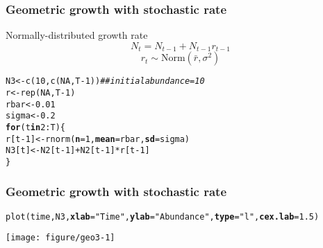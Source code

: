 \documentclass[color=usenames,dvipsnames]{beamer}\usepackage[]{graphicx}\usepackage[]{color}
\makeatletter
\newcommand{\hlnum}[1]{\textcolor[rgb]{0.69,0.494,0}{#1}}%
\newcommand{\hlstr}[1]{\textcolor[rgb]{0.749,0.012,0.012}{#1}}%
\newcommand{\hlcom}[1]{\textcolor[rgb]{0.514,0.506,0.514}{\textit{#1}}}%
\newcommand{\hlopt}[1]{\textcolor[rgb]{0,0,0}{#1}}%
\newcommand{\hlstd}[1]{\textcolor[rgb]{0,0,0}{#1}}%
\newcommand{\hlkwa}[1]{\textcolor[rgb]{0,0,0}{\textbf{#1}}}%
\newcommand{\hlkwb}[1]{\textcolor[rgb]{0,0.341,0.682}{#1}}%
\newcommand{\hlkwc}[1]{\textcolor[rgb]{0,0,0}{\textbf{#1}}}%
\newcommand{\hlkwd}[1]{\textcolor[rgb]{0.004,0.004,0.506}{#1}}%
\newenvironment{kframe}{%
 \def\at@end@of@kframe{}%
 \ifinner\ifhmode%
  \def\at@end@of@kframe{\end{minipage}}%
  \begin{minipage}{\columnwidth}%
 \fi\fi%
 \def\FrameCommand##1{\hskip\@totalleftmargin \hskip-\fboxsep
 \colorbox{shadecolor}{##1}\hskip-\fboxsep
     \hskip-\linewidth \hskip-\@totalleftmargin \hskip\columnwidth}%
 \MakeFramed {\advance\hsize-\width
   \@totalleftmargin\z@ \linewidth\hsize
   \@setminipage}}%
 {\par\unskip\endMakeFramed%
 \at@end@of@kframe}
\newenvironment{knitrout}{}{} %
\makeatother
\begin{document}
\begin{frame}[fragile]
  \frametitle{Geometric growth with stochastic rate}
  Normally-distributed growth rate
  \[
    N_t = N_{t-1} + N_{t-1}r_{t-1}
  \]
  \[
    r_t \sim \mathrm{Norm}(\bar{r}, \sigma^2)
  \]
  \pause
\begin{knitrout}\small
{}\color{fgcolor}\begin{kframe}
\begin{alltt}
\hlstd{N3} \hlkwb{<-} \hlkwd{c}\hlstd{(}\hlnum{10}\hlstd{,} \hlkwd{c}\hlstd{(}\hlnum{NA}\hlstd{, T}\hlopt{-}\hlnum{1}\hlstd{))}  \hlcom{## initial abundance = 10}
\hlstd{r} \hlkwb{<-} \hlkwd{rep}\hlstd{(}\hlnum{NA}\hlstd{, T}\hlopt{-}\hlnum{1}\hlstd{)}
\hlstd{rbar} \hlkwb{<-} \hlnum{0.01}
\hlstd{sigma} \hlkwb{<-} \hlnum{0.2}
\hlkwa{for}\hlstd{(t} \hlkwa{in} \hlnum{2}\hlopt{:}\hlstd{T) \{}
    \hlstd{r[t}\hlopt{-}\hlnum{1}\hlstd{]} \hlkwb{<-} \hlkwd{rnorm}\hlstd{(}\hlkwc{n}\hlstd{=}\hlnum{1}\hlstd{,} \hlkwc{mean}\hlstd{=rbar,} \hlkwc{sd}\hlstd{=sigma)}
    \hlstd{N3[t]} \hlkwb{<-} \hlstd{N2[t}\hlopt{-}\hlnum{1}\hlstd{]} \hlopt{+} \hlstd{N2[t}\hlopt{-}\hlnum{1}\hlstd{]}\hlopt{*}\hlstd{r[t}\hlopt{-}\hlnum{1}\hlstd{]}
\hlstd{\}}
\end{alltt}
\end{kframe}
\end{knitrout}
\end{frame}



\begin{frame}[fragile]
  \frametitle{Geometric growth with stochastic rate}
\begin{knitrout}\scriptsize
{}\color{fgcolor}\begin{kframe}
\begin{alltt}
\hlkwd{plot}\hlstd{(time, N3,} \hlkwc{xlab}\hlstd{=}\hlstr{"Time"}\hlstd{,} \hlkwc{ylab}\hlstd{=}\hlstr{"Abundance"}\hlstd{,} \hlkwc{type}\hlstd{=}\hlstr{"l"}\hlstd{,} \hlkwc{cex.lab}\hlstd{=}\hlnum{1.5}\hlstd{)}
\end{alltt}
\end{kframe}

{\centering \texttt{[image: figure/geo3-1]} 

}



\end{knitrout}
\end{frame}
\end{document}
